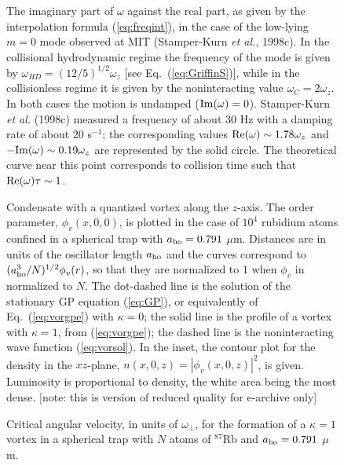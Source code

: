 \bigskip

\begin{figure}[t]
\epsfysize=8cm
\hspace{3cm}
\caption{The imaginary part of $\omega$ against the real part, as given 
by the interpolation formula (\protect\ref{eq:freqint}), in the  case of 
the low-lying $m=0$ mode observed at MIT (Stamper-Kurn {\it et al.}, 1998c). 
In the collisional hydrodynamic 
regime the frequency of the mode is given by $\omega_{HD}=(12/5)^{1/2}
\omega_z$  [see  Eq.~(\protect\ref{eq:GriffinS})], while in the 
collisionless regime it is given by the noninteracting value 
$\omega_C=2\omega_z$. In both cases the motion is undamped (${\rm Im}
(\omega)=0$).  Stamper-Kurn {\it et al.} (1998c) measured a 
frequency of about $30$ Hz with a damping rate of about $20$ s$^{-1}$; 
the corresponding values ${\rm Re}(\omega) \sim 1.78 \omega_z$ and 
$-{\rm Im}(\omega) \sim 0.19 \omega_z$ are represented by the solid circle.
The theoretical curve near this point corresponds to collision time 
such that ${\rm Re} (\omega) \tau \sim 1$.   } 
\label{fig:s-omega}
\end{figure}

\bigskip

\begin{figure}[t]
\epsfysize=8cm
\hspace{3cm}
\caption{Condensate with a quantized vortex along the $z$-axis. The order
parameter, $\phi_v(x,0,0)$, is plotted in the case of $10^4$ rubidium  
atoms confined in a spherical trap with $a_{\rm ho}=0.791$ $\mu$m.  
Distances are in units of the oscillator length $a_{\rm ho}$ and
the curves correspond  to $(a_{\rm ho}^3/N)^{1/2} \phi_v(r)$, so 
that they are normalized to $1$ when $\phi_v$ in normalized to $N$.   
The dot-dashed line is the solution of the stationary GP equation 
(\protect\ref{eq:GP}), or equivalently of Eq.~(\protect\ref{eq:vorgpe})
with $\kappa=0$; the solid line is the profile of a vortex with $\kappa=1$,
from (\protect\ref{eq:vorgpe});  the dashed line is the noninteracting 
wave function (\protect\ref{eq:vorsol}). In the inset, the contour plot 
for the density in the $xz$-plane, $n(x,0,z)=|\phi_v(x,0,z)|^2$, is
given. Luminosity is proportional to density, the white area being the
most dense. [note: this is version of reduced quality for e-archive 
only]  }
\label{fig:vortex}
\end{figure}

\bigskip

\begin{figure}[t]
\epsfysize=8cm
\hspace{3cm}
\caption{Critical angular velocity, in units of $\omega_\perp$,  for the
formation of a $\kappa=1$ vortex in a spherical trap with $N$ atoms
of $^{87}$Rb and $a_{\rm ho}=0.791$ $\mu$m.  } 
\label{fig:omegac}
\end{figure}

